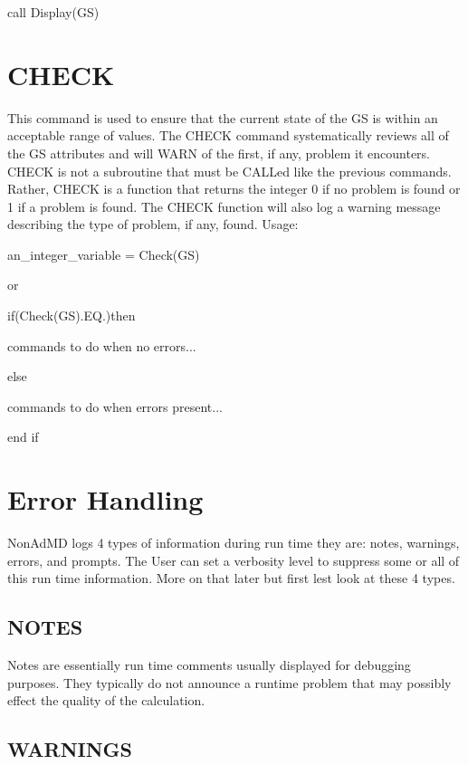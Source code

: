  call Display(\-G\-S)\par
 \hypertarget{_interface_CHECK}{}\section{C\-H\-E\-C\-K}\label{_interface_CHECK}
This command is used to ensure that the current state of the G\-S is within an acceptable range of values. The C\-H\-E\-C\-K command systematically reviews all of the G\-S attributes and will W\-A\-R\-N of the first, if any, problem it encounters. C\-H\-E\-C\-K is not a subroutine that must be C\-A\-L\-Led like the previous commands. Rather, C\-H\-E\-C\-K is a function that returns the integer 0 if no problem is found or 1 if a problem is found. The C\-H\-E\-C\-K function will also log a warning message describing the type of problem, if any, found. Usage\-:\par
 \par
 an\-\_\-integer\-\_\-variable = Check(\-G\-S)\par
 or\par
 if(Check(\-G\-S).E\-Q.)then\par
  commands to do when no errors...\par
 else\par
  commands to do when errors present... \par
 end if\par
 \par
 \hypertarget{_interface_Error_Handling}{}\section{Error Handling}\label{_interface_Error_Handling}
Non\-Ad\-M\-D logs 4 types of information during run time they are\-: notes, warnings, errors, and prompts. The User can set a verbosity level to suppress some or all of this run time information. More on that later but first lest look at these 4 types.\par
 \hypertarget{_interface_NOTES}{}\subsection{N\-O\-T\-E\-S}\label{_interface_NOTES}
Notes are essentially run time comments usually displayed for debugging purposes. They typically do not announce a runtime problem that may possibly effect the quality of the calculation.\par
 \hypertarget{_interface_WARNINGS}{}\subsection{W\-A\-R\-N\-I\-N\-G\-S}\label{_interface_WARNINGS}
